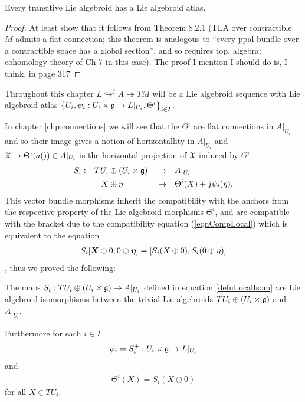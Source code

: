 \begin{theorem}
Every transitive Lie algebroid has a Lie algebroid atlas.
\end{theorem}
\begin{proof}
At least show that it follows from Theorem 8.2.1 (TLA over contractible $M$ admits a flat connection; this theorem is analogous to ``every ppal bundle over a contractible space has a global section'', and so requires top. algebra: cohomology theory of Ch 7 in this case). The proof I mention I should do is, I think, in page 317
\end{proof}

Throughout this chapter $L \hookrightarrow^j A \twoheadrightarrow TM$ will be a Lie algebroid sequence with Lie algebroid atlas $\left\{ U_i, \psi_i:U_i \times \mathfrak{g}\to L|_{U_i}, \Theta^i \right\}_{i \in I}$.

In chapter \ref{chp:connections} we will see that the $\Theta^i$ are flat connections in $A|_{U_i}$ and so their image gives a notion of horizontallity in $A|_{U_i}$ and $ \mathfrak{X} \mapsto \Theta^i(a(\mathfrak{)}) \in A|_{U_i}$ is the horizontal projection of $\mathfrak{X}$ induced by $\Theta^i$.
\begin{align}\label{defnLocalIsom}
    S_i:&& TU_i &\oplus (U_i \times \mathfrak{g}) &&\to&& A|_{U_i}\\
        && X &\oplus \eta && \mapsto && \Theta^i(X) + j\psi_i(\eta).
\end{align}
This vector bundle morphisms inherit the compatibility with the anchors from the respective property of the Lie algebroid morphisms $\Theta^i$, and are compatible with the bracket due to the compatibility equation (\ref{eqnCompLocal}) which is equivalent to the equation
\begin{align*}
    S_i[\bm{X} \oplus 0, 0 \oplus \bm{\eta}] = [S_i(X \oplus 0), S_i(0 \oplus \eta)]
\end{align*}, thus we proved the following:

\begin{theorem}
The maps $S_i : TU_i \oplus (U_i \times \mathfrak{g}) \to A|_{U_i}$ defined in equation \ref{defnLocalIsom} are Lie algebroid isomorphisms between the trivial Lie algebroids $TU_i \oplus (U_i \times \mathfrak{g})$ and $A|_{U_i}$.

Furthermore for each $i \in I$ 
\begin{align*}
    \psi_i = S_i^+: U_i \times \mathfrak{g} \to L|_{U_i}
\end{align*} and 
\begin{align*}
    \Theta^i(X) = S_i(X \oplus 0)
\end{align*}
for all $X \in TU_i$.
\end{theorem}

